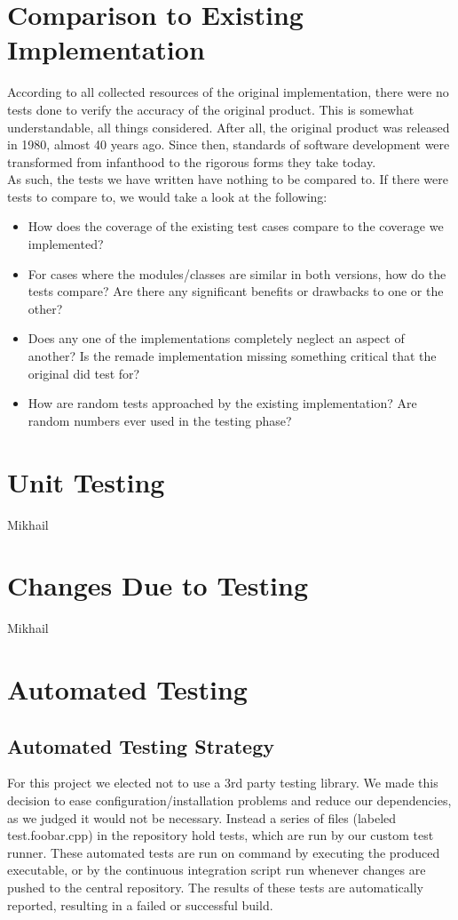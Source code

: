 \documentclass[12pt, titlepage]{article}
\newcommand{\newsection}[1]{
  \newpage
  \section{#1}
}
\begin{document}
\newsection{Comparison to Existing Implementation} \label{Section_Comparison}

	According to all collected resources of the original implementation, there were no tests done to verify the accuracy of the original product. This is somewhat understandable, all things considered. After all, the original product was released in 1980, almost 40 years ago. Since then, standards of software development were transformed from infanthood to the rigorous forms they take today.\\

	As such, the tests we have written have nothing to be compared to. If there were tests to compare to, we would take a look at the following:\\

	\begin{itemize}
		\item How does the coverage of the existing test cases compare to the coverage we implemented?
		\item For cases where the modules/classes are similar in both versions, how do the tests compare? Are there any significant benefits or drawbacks to one or the other?
		\item Does any one of the implementations completely neglect an aspect of another? Is the remade implementation missing something critical that the original did test for?
		\item How are random tests approached by the existing implementation? Are random numbers ever used in the testing phase?
	\end{itemize}

\newsection{Unit Testing} \label{Section_UT}
	Mikhail

\newsection{Changes Due to Testing} \label{Section_Changes}
	Mikhail

\newsection{Automated Testing} \label{Section_Automated}

	\subsection{Automated Testing Strategy}
	For this project we elected not to use a 3rd party testing library. We made this decision to ease configuration/installation problems and reduce our dependencies, as we judged it would not be necessary. Instead a series of files (labeled test.foobar.cpp) in the repository hold tests, which are run by our custom test runner. These automated tests are run on command by executing the produced executable, or by the continuous integration script run whenever changes are pushed to the central repository. The results of these tests are automatically reported, resulting in a failed or successful build.
\end{document}
